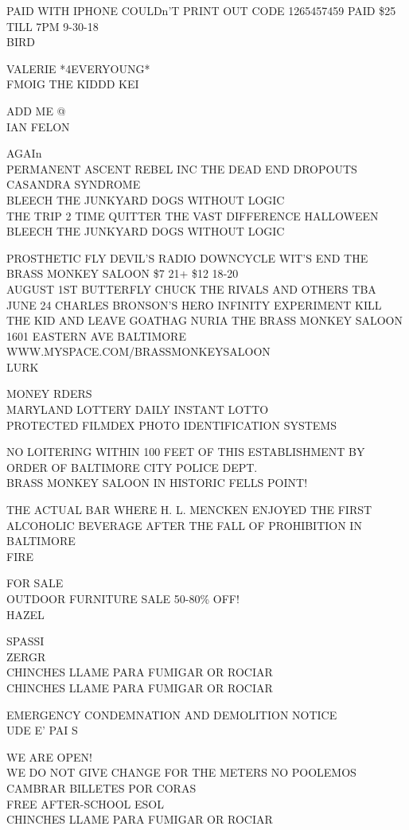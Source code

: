 \documentclass[10pt,letterpaper]{article}
\begin{document}
PAID WITH IPHONE COULDn'T PRINT OUT CODE 1265457459 PAID \$25 TILL 7PM 9{-}30{-}18\\
BIRD

VALERIE *4EVERYOUNG*\\
FMOIG THE KIDDD KEI

ADD ME @\\
IAN FELON

AGAIn\\
PERMANENT ASCENT REBEL INC THE DEAD END DROPOUTS CASANDRA SYNDROME\\
BLEECH THE JUNKYARD DOGS WITHOUT LOGIC\\
THE TRIP 2 TIME QUITTER THE VAST DIFFERENCE HALLOWEEN BLEECH THE JUNKYARD DOGS WITHOUT LOGIC

PROSTHETIC FLY DEVIL'S RADIO DOWNCYCLE WIT'S END THE BRASS MONKEY SALOON \$7 21+ \$12 18{-}20\\
AUGUST 1ST BUTTERFLY CHUCK THE RIVALS AND OTHERS TBA\\
JUNE 24 CHARLES BRONSON'S HERO INFINITY EXPERIMENT KILL THE KID AND LEAVE GOATHAG NURIA THE BRASS MONKEY SALOON 1601 EASTERN AVE BALTIMORE WWW.MYSPACE.COM/BRASSMONKEYSALOON\\
LURK

MONEY RDERS\\
MARYLAND LOTTERY DAILY INSTANT LOTTO\\
PROTECTED FILMDEX PHOTO IDENTIFICATION SYSTEMS

NO LOITERING WITHIN 100 FEET OF THIS ESTABLISHMENT BY ORDER OF BALTIMORE CITY POLICE DEPT.\\
BRASS MONKEY SALOON IN HISTORIC FELLS POINT!

THE ACTUAL BAR WHERE H. L. MENCKEN ENJOYED THE FIRST ALCOHOLIC BEVERAGE AFTER THE FALL OF PROHIBITION IN BALTIMORE\\
FIRE

FOR SALE\\
OUTDOOR FURNITURE SALE 50{-}80\% OFF!\\
HAZEL

SPASSI\\
ZERGR\\
CHINCHES LLAME PARA FUMIGAR OR ROCIAR\\
CHINCHES LLAME PARA FUMIGAR OR ROCIAR

EMERGENCY CONDEMNATION AND DEMOLITION NOTICE\\
UDE E' PAI S

WE ARE OPEN!\\
WE DO NOT GIVE CHANGE FOR THE METERS NO POOLEMOS CAMBRAR BILLETES POR CORAS\\
FREE AFTER{-}SCHOOL ESOL\\
CHINCHES LLAME PARA FUMIGAR OR ROCIAR
\end{document}
